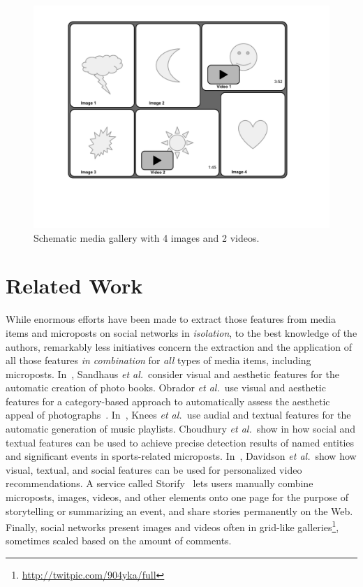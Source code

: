 \begin{figure}[htb]
\centering
\includegraphics[trim=20mm 40mm 20mm 10mm, clip, width=0.75\columnwidth]{media-gallery.pdf}
\caption{Schematic media gallery with 4 images and 2 videos.}
\label{fig:media-gallery}
\end{figure}

\section{Related Work}
While enormous efforts have been made to extract those features
from media items and microposts on social networks in \emph{isolation},
to the best knowledge of the authors, remarkably less initiatives 
concern the extraction and the application
of all those features \emph{in combination}
for \emph{all} types of media items, including microposts.
In~\cite{Photo2011}, Sandhaus \emph{et al.}\ consider visual and
aesthetic features for the automatic creation of photo books.
Obrador \emph{et al.}\ use visual and aesthetic features
for a category-based approach to automatically assess
the aesthetic appeal of photographs~\cite{Photo2012}.
In~\cite{Playlist2006}, Knees \emph{et al.}\ use audial and textual
features for the automatic generation of music playlists.
Choudhury \emph{et al.}\ show in \cite{Sports2011} how social and textual
features can be used to achieve precise detection results 
of named entities and significant events in sports-related microposts.
In~\cite{YouTube2010}, Davidson \emph{et al.}\ show how visual,
textual, and social features can be used for personalized video recommendations.
A service called Storify~\cite{Storify2011} lets users manually combine
microposts, images, videos, and other elements onto one page for the purpose
of storytelling or summarizing an event,
and share stories permanently on the Web.
Finally, social networks present images and videos
often in grid-like galleries\footnote{\url{http://twitpic.com/904yka/full}}, sometimes scaled
based on the amount of comments.

